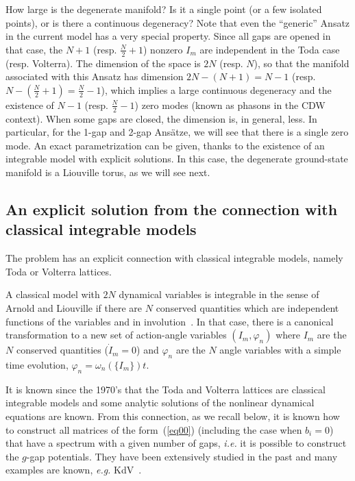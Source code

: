 \documentclass[]{revtex4-1}
\begin{document}
How large is the degenerate manifold? Is it a single point (or a few isolated points), or is there a continuous degeneracy? Note that even the ``generic'' Ansatz in the current model has a very special property. Since all gaps are opened in that case,  the $N+1$  (resp. $\frac{N}{2}+1$) nonzero $I_m$ are independent in the Toda case (resp. Volterra).  The dimension of the space is $2N$ (resp. $N$), so that the manifold associated with this Ansatz has dimension $2N-(N+1)=N-1$ (resp. $N-(\frac{N}{2}+1)=\frac{N}{2}-1$), which implies a large continuous degeneracy and the existence of $N-1$ (resp. $\frac{N}{2}-1$) zero modes (known as phasons in the CDW context).
When some gaps are closed, the dimension is, in general, less. In particular, for the 1-gap and 2-gap Ans\"atze, we will see that there is a single zero mode.
An exact parametrization can be given, thanks to the existence of an integrable model with explicit solutions. In this case, the degenerate ground-state manifold is a Liouville torus, as we will see next.

\subsection{An explicit solution from the connection with classical integrable models}
\label{solution}

The problem has an explicit connection with classical integrable models, namely Toda or Volterra lattices.

A classical model with $2N$ dynamical variables is integrable in the sense of Arnold and Liouville if there are $N$ conserved quantities which are independent functions of the variables and in involution~\cite{Babelon,arnold}. In that case, there is a canonical transformation to a new set of action-angle variables $(I_m,\varphi_n)$ where $I_m$ are the $N$ conserved quantities ($\dot{I}_m=0$) and $\varphi_n$ are the $N$ angle variables with a simple time evolution, $\varphi_n=\omega_n(\{I_m \})t$.

It is known since the 1970's that the Toda and Volterra lattices are classical integrable models and some analytic solutions of the nonlinear dynamical equations are known.
From this connection, as we recall below, it is known how to construct all matrices of the form~(\ref{eq00}) (including the case when $b_i=0$) that have a spectrum with a given number of gaps, \textit{i.e.} it is possible to construct the $g$-gap potentials. They have been extensively studied in the past and many examples are known, \textit{e.g.} KdV~\cite{Babelon,Dubrovin}.  
\end{document}
